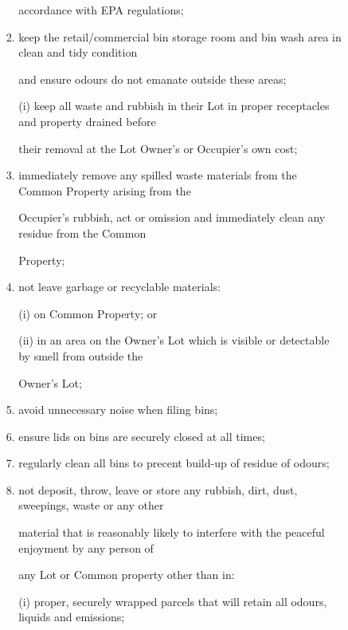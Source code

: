 \documentclass{article}
\begin{document}
\begin{enumerate}[label=\arabic*.]
\begin{enumerate}[label=\arabic{enumi}.\arabic*.]
\begin{enumerate}[label=(\arabic*)]
\begin{enumerate}[label=(\alph*)]
{\fontsize{10.02}{1}accordance with EPA regulations; }

\item {\fontsize{9.962}{1} keep the retail/commercial bin storage room and bin wash area in clean and tidy condition }

{\fontsize{10.02}{1}and ensure odours do not emanate outside these areas; }

{\fontsize{9.962}{1}(i) keep all waste and rubbish in their Lot in proper receptacles and property drained before }

{\fontsize{10.02}{1}their removal at the Lot Owner’s or Occupier’s own cost; }

\item {\fontsize{9.962}{1} immediately remove any spilled waste materials from the Common Property arising from the }

{\fontsize{10.02}{1}Occupier’s rubbish, act or omission and immediately clean any residue from the Common }

{\fontsize{10.02}{1}Property; }

\item {\fontsize{9.962}{1} not leave garbage or recyclable materials: }

{\fontsize{9.962}{1}(i) on Common Property; or }

{\fontsize{9.962}{1}(ii) in an area on the Owner’s Lot which is visible or detectable by smell from outside the }

{\fontsize{10.02}{1}Owner’s Lot; }

\item {\fontsize{9.962}{1} avoid unnecessary noise when filing bins; }

\item {\fontsize{9.962}{1} ensure lids on bins are securely closed at all times; }

\item {\fontsize{9.962}{1} regularly clean all bins to precent build-up of residue of odours; }

\item {\fontsize{9.962}{1} not deposit, throw, leave or store any rubbish, dirt, dust, sweepings, waste or any other }

{\fontsize{10.02}{1}material that is reasonably likely to interfere with the peaceful enjoyment by any person of }

{\fontsize{10.02}{1}any Lot or Common property other than in: }

{\fontsize{9.962}{1}(i) proper, securely wrapped parcels that will retain all odours, liquids and emissions; }


\end{enumerate}
\end{enumerate}
\end{enumerate}
\end{enumerate}
\end{document}
